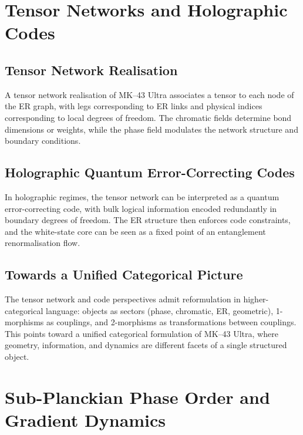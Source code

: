 \chapter{Tensor Networks and Holographic Codes}

\section{Tensor Network Realisation}

A tensor network realisation of MK--43 Ultra associates a tensor to each node of the ER graph, with legs corresponding to ER links and physical indices corresponding to local degrees of freedom.
The chromatic fields determine bond dimensions or weights, while the phase field modulates the network structure and boundary conditions.

\section{Holographic Quantum Error-Correcting Codes}

In holographic regimes, the tensor network can be interpreted as a quantum error-correcting code, with bulk logical information encoded redundantly in boundary degrees of freedom.
The ER structure then enforces code constraints, and the white-state core can be seen as a fixed point of an entanglement renormalisation flow.

\section{Towards a Unified Categorical Picture}

The tensor network and code perspectives admit reformulation in higher-categorical language:
objects as sectors (phase, chromatic, ER, geometric), 1-morphisms as couplings, and 2-morphisms as transformations between couplings.
This points toward a unified categorical formulation of MK--43 Ultra, where geometry, information, and dynamics are different facets of a single structured object.


\chapter{Sub-Planckian Phase Order and Gradient Dynamics}

